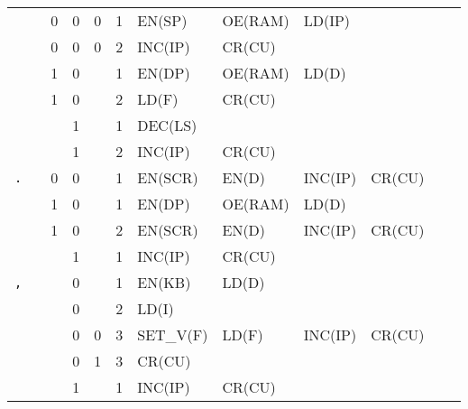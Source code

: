 \begin{longtable}[c] {c|cccc|c|llllll}
    \rowcolor{Gray}               &   & 0 & 0     & 0    & 1     & EN(SP)   & OE(RAM)  & LD(IP)  &        &        &        \\
    \rowcolor{Gray}               &   & 0 & 0     & 0    & 2     & INC(IP)  & CR(CU)   &         &        &        &        \\
    \rowcolor{White}              &   & 1 & 0     &      & 1     & EN(DP)   & OE(RAM)  & LD(D)   &        &        &        \\
    \rowcolor{White}              &   & 1 & 0     &      & 2     & LD(F)    & CR(CU)   &         &        &        &        \\
    \rowcolor{Gray}               &   &   & 1     &      & 1     & DEC(LS)  &          &         &        &        &        \\ 
    \rowcolor{Gray}               &   &   & 1     &      & 2     & INC(IP)  & CR(CU)   &         &        &        &        \\ \hline
    
    \rowcolor{Gray}  \texttt{.}   &   & 0 & 0     &      & 1     & EN(SCR)  & EN(D)    & INC(IP) & CR(CU) &        &        \\
    \rowcolor{White}              &   & 1 & 0     &      & 1     & EN(DP)   & OE(RAM)  & LD(D)   &        &        &        \\
    \rowcolor{White}              &   & 1 & 0     &      & 2     & EN(SCR)  & EN(D)    & INC(IP) & CR(CU) &        &        \\
    \rowcolor{Gray}               &   &   & 1     &      & 1     & INC(IP)  & CR(CU)   &         &        &        &        \\ \hline
    
    \rowcolor{White} \texttt{,}   &   &   & 0     &      & 1     & EN(KB)   & LD(D)    &         &        &        &        \\
    \rowcolor{White}              &   &   & 0     &      & 2     & LD(I)    &          &         &        &        &        \\
    \rowcolor{White}              &   &   & 0     & 0    & 3     & SET\_V(F)   & LD(F)    & INC(IP) & CR(CU) &        &        \\
    \rowcolor{Gray}               &   &   & 0     & 1    & 3     & CR(CU)   &          &         &        &        &        \\   
    \rowcolor{White}              &   &   & 1     &      & 1     & INC(IP)  & CR(CU)   &         &        &        &        \\ \hline
    

\end{longtable}
